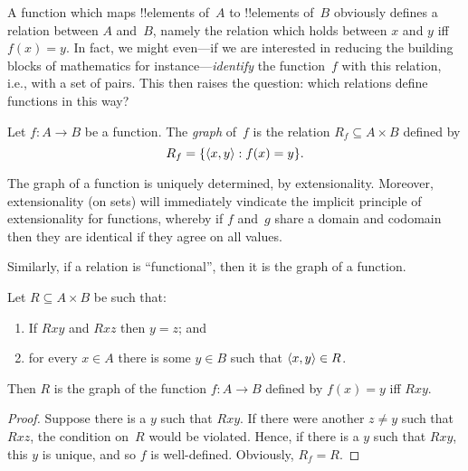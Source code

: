 \documentclass[../../../include/open-logic-section]{subfiles}
\begin{document}


\begin{explain} 
A function which maps !!{element}s of~$A$ to !!{element}s of~$B$
obviously defines a relation between $A$ and~$B$, namely the relation
which holds between $x$ and $y$ iff $f(x) = y$.  In fact, we might
even---if we are interested in reducing the building blocks of
mathematics for instance---\emph{identify} the function~$f$ with this
relation, i.e., with a set of pairs.  This then raises the question:
which relations define functions in this way?
\end{explain}

\begin{defn} Let $f\colon A \to B$ be a function.
The \emph{graph} of~$f$ is the relation $R_f \subseteq A \times B$
defined by
\[
R_f = \{ \langle x,y \rangle : f(x) = y \}.
\]
\end{defn}

\begin{explain}
The graph of a function is uniquely determined, by extensionality.
Moreover, extensionality (on sets) will immediately vindicate the
implicit principle of extensionality for functions,
whereby if $f$ and~$g$ share a domain and codomain then they are
identical if they agree on all values. 

Similarly, if a relation is ``functional'', then it is the graph of a function. 
\end{explain}

\begin{prop}
Let $R \subseteq A \times B$ be such that:
\begin{enumerate}
\item If $Rxy$ and $Rxz$ then $y = z$; and 
\item for every $x \in A$ there is some $y \in B$ such that $\langle x,
y \rangle \in R$.  
\end{enumerate}
Then $R$ is the graph of the function $f\colon A \to B$ defined by
$f(x) = y$ iff $Rxy$. 
\end{prop}

\begin{proof}
Suppose there is a $y$ such that $Rxy$.  If there were another $z \neq
y$ such that $Rxz$, the condition on~$R$ would be violated. Hence, if
there is a $y$ such that $Rxy$, this $y$ is unique, and so $f$ is
well-defined.  Obviously, $R_f = R$.
\end{proof}
\end{document}
